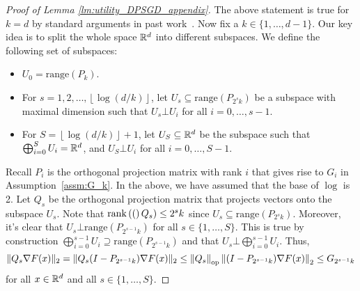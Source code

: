 \begin{proof}[Proof of Lemma \ref{lm:utility_DPSGD_appendix}]
The above statement is true for $k = d$ by standard arguments in past work~\citep{bassily2014private,song2021evading}.
Now fix a $k \in \{1, \dots, d - 1\}$.
Our key idea is to split the whole space $\mathbb{R}^d$ into different subspaces.
We define the following set of subspaces:
\begin{itemize}
\item $U_{0}=\text{range}(P_{k})$.
\item For $s=1,2,\ldots,\left\lfloor \log(d/k)\right\rfloor$, 
    let $U_{s} \subseteq \text{range}(P_{2^{s}k})$ be a subspace with maximal dimension such that $U_s \bot U_i$ for all $i=0, \dots, s-1$.
\item For $S=\left\lfloor \log(d/k)\right\rfloor +1$, 
    let $U_{S} \subseteq \mathbb{R}^{d}$ be the subspace such that $\bigoplus_{i=0}^S U_i = \mathbb{R}^d$, and $U_S \bot U_i$ for all $i=0, \dots, S-1$.
\end{itemize}
Recall $P_{i}$ is the orthogonal projection matrix with rank $i$ that gives rise to $G_{i}$ in Assumption~\ref{assm:G_k}. 
In the above, we have assumed that the base of $\log$ is 2.
Let $Q_{s}$ be the orthogonal projection matrix that projects vectors onto the subspace $U_{s}$. 
Note that $\mathrm{rank}\left((\right)Q_{s})\leq 2^{s}k$ since $U_s \subseteq \text{range}(P_{2^s k})$.
Moreover, it's clear that $U_s \bot \text{range}(P_{2^{s-1}k})$ for all $s \in \{1, \dots, S\}$. 
This is true by construction $\bigoplus_{i=0}^{s-1} U_i \supseteq \text{range}(P_{2^{s-1}k})$ and that 
$U_s \bot \bigoplus_{i=0}^{s-1} U_i$. Thus,
\begin{equation}
\label{eq:Qbound}
\|Q_{s}\nabla F(x)\|_{2} =
\|Q_{s} (I - P_{2^{s-1}k}) \nabla F(x)\|_{2}
\le 
\left\lVert Q_{s}\right\rVert_{\mathrm{op}} \left\lVert(I - P_{2^{s-1}k}) \nabla F(x)\right\rVert_2
\leq G_{2^{s-1}k}
\end{equation}
for all $x \in \mathbb{R}^d$ and all $s \in \{1, \dots, S\}$.


\end{proof}
